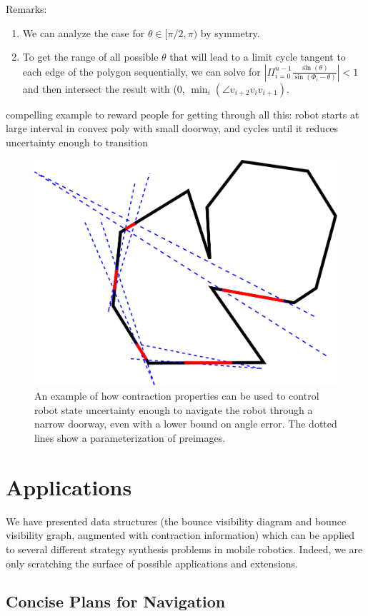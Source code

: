 \documentclass[]{svproc}  %
\begin{document}
Remarks:

\begin{enumerate}
    \item We can analyze the case for $\theta \in [\pi/2, \pi)$ by symmetry.
    \item To get the range of all possible $\theta$ that will lead to a limit cycle tangent to each edge of the polygon sequentially, we can solve for $|\Pi_{i = 0}^{n-1}\frac{\sin(\theta)}{\sin(\Phi_{i}-\theta)}|<1$ and then intersect the result with (0, $\min_{i}(\angle v_{i+2}v_{i}v_{i+1})$.
\end{enumerate}

{\color{red} compelling example to reward people for getting through all this:
robot starts at large interval in convex poly with small doorway, and cycles
until it reduces uncertainty enough to transition}

\begin{figure}
    \includegraphics[width=0.6\linewidth]{figures/bounce_preimages.pdf}
    \centering
    \caption{An example of how contraction properties can be used to control
robot state uncertainty enough to navigate the robot through a narrow doorway,
even with a lower bound on angle error. The dotted lines show a 
parameterization of preimages.}
\label{fig:preimage_example}
\end{figure}


\section{Applications}

We have presented data structures (the bounce visibility diagram and bounce
visibility graph, augmented with contraction information) which can be applied
to several different strategy synthesis problems in mobile robotics. Indeed, we
are only scratching the surface of possible applications and extensions.

\subsection{Concise Plans for Navigation}
\end{document}

